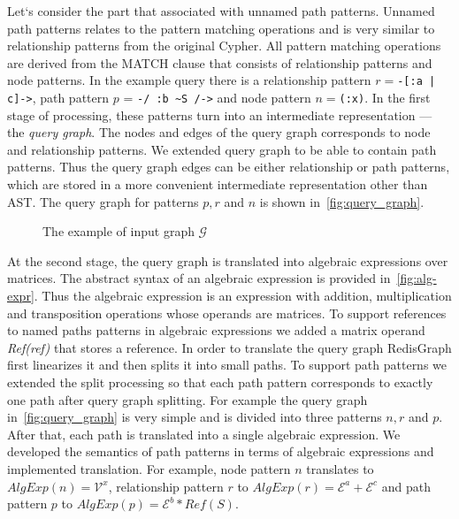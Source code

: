Let`s consider the part that associated with unnamed path patterns. Unnamed path patterns relates to the pattern matching operations and is very similar to relationship patterns from the original Cypher. All pattern matching operations are derived from the MATCH clause that consists of relationship patterns and node patterns. In the example query there is a relationship pattern $r = $\lstinline{-[:a | c]->}, path pattern $p$ = \lstinline{-/ :b ~S /->} and node pattern $n = $\lstinline{(:x)}. In the first stage of processing, these patterns turn into an intermediate representation --- the \textit{query graph}. The nodes and edges of the query graph corresponds to node and relationship patterns. We extended query graph to be able to contain path patterns. Thus the query graph edges can be either relationship or path patterns, which are stored in a more convenient intermediate representation other than AST. The query graph for patterns $p, r$ and $n$ is shown in~\autoref{fig:query_graph}.

\begin{figure}[h]
    \centering        
    \caption{The example of input graph $\mathcal{G}$}
    \label{fig:query_graph}
\end{figure}

At the second stage, the query graph is translated into algebraic expressions over matrices. The abstract syntax of an algebraic expression is provided in~\autoref{fig:alg-expr}. Thus the algebraic expression is an expression with addition, multiplication and transposition operations whose operands are matrices. To support references to named paths patterns in algebraic expressions we added a matrix operand \textit{Ref(ref)} that stores a reference. In order to translate the query graph RedisGraph first linearizes it and then splits it into small paths. To support path patterns we extended the split processing so that each path pattern corresponds to exactly one path after query graph splitting. For example the query graph in~\autoref{fig:query_graph} is very simple and is divided into three patterns $n, r$ and $p$. After that, each path is translated into a single algebraic expression. We developed the semantics of path patterns in terms of algebraic expressions and implemented translation. For example, node pattern $n$ translates to $AlgExp(n) = \mathcal{V}^x$, relationship pattern $r$ to $AlgExp(r) = \mathcal{E}^a + \mathcal{E}^c$ and path pattern $p$ to $AlgExp(p) = \mathcal{E}^b * Ref(S)$.

